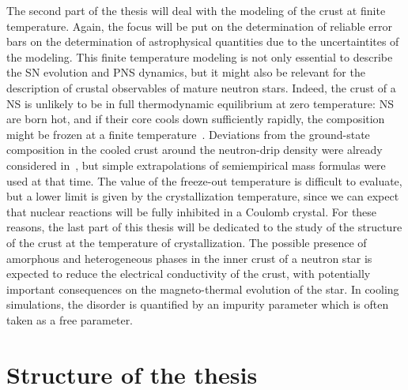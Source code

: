 The second part of the thesis will deal with the modeling of the crust at 
finite temperature. Again, the focus will be put on the determination of 
reliable error bars on the determination of astrophysical quantities due to the 
uncertaintites of the modeling. This finite temperature modeling is not only 
essential to describe the SN evolution and PNS dynamics, but it might also be 
relevant for the description of crustal observables of mature neutron stars. 
Indeed, the crust of a NS is unlikely to be in full thermodynamic equilibrium 
at zero temperature: NS are born hot, and if their core cools 
down sufficiently rapidly, the composition might be frozen at a finite 
temperature~\cite{Goriely2011}. 
Deviations from the ground-state composition in the cooled crust around the 
neutron-drip density were already considered in~\cite{Bisnovaty1979}, but 
simple extrapolations of semiempirical mass formulas were used at that time. 
The value of the freeze-out temperature is difficult to evaluate, but a lower 
limit is given by the crystallization temperature, since we can expect that 
nuclear reactions will be fully inhibited in a Coulomb crystal. 
For these reasons, the last part of this thesis will be dedicated to the study 
of the structure of the crust at the temperature of crystallization. 
The possible presence of amorphous and heterogeneous phases in the inner crust 
of a neutron star is expected to reduce the electrical conductivity of the 
crust, with potentially important consequences on the magneto-thermal evolution 
of the star. In cooling simulations, the disorder is quantified by an impurity 
parameter which is often taken as a free parameter.

\section*{Structure of the thesis}

